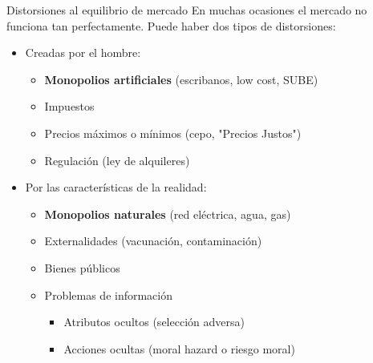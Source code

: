 \documentclass{beamer}
\begin{document}
\begin{frame}{Distorsiones al equilibrio de mercado}
    En muchas ocasiones el mercado no funciona tan perfectamente. Puede haber dos tipos de distorsiones: \vspace{1mm}
    \begin{itemize}
        \item Creadas por el hombre:
        \begin{itemize}
            \item \textbf{Monopolios artificiales} (escribanos, low cost, SUBE)
                \vspace{1mm}
                \item Impuestos
                \vspace{1mm}
            \item Precios máximos o mínimos (cepo, "Precios Justos")
                \vspace{1mm}
            \item Regulación (ley de alquileres)
        \end{itemize}
        \vspace{1mm}
        \item Por las características de la realidad:
        \begin{itemize}
            \item \textbf{Monopolios naturales} (red eléctrica, agua, gas)   
                \vspace{1mm}
            \item Externalidades (vacunación, contaminación)
                \vspace{1mm}
            \item Bienes públicos
            \vspace{1mm}
            \item Problemas de información
            \begin{itemize}
                \item Atributos ocultos (selección adversa)
                    \vspace{1mm}
                \item Acciones ocultas (moral hazard o riesgo moral)
            \end{itemize}        
        \end{itemize}
    \end{itemize}
\end{frame}
\end{document}

